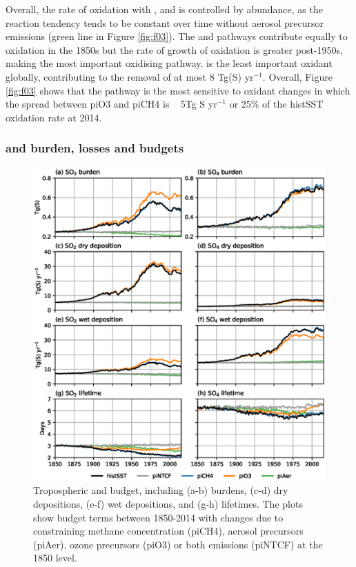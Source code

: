 Overall, the rate of  oxidation with ,  and  is controlled by  abundance, as the reaction tendency tends to be constant over time without aerosol precursor emissions (green line in Figure \ref{fig:f03}). The  and  pathways contribute equally to  oxidation in the 1850s but the rate of growth of  oxidation is greater post-1950s, making  the most important oxidising pathway.  is the least important oxidant globally, contributing to the removal of at most 8 Tg(S) yr$^{-1}$. Overall, Figure \ref{fig:f03} shows that the  pathway is the most sensitive to oxidant changes in which the spread between piO3 and piCH4 is ~ 5Tg S yr$^{-1}$ or 25\% of the histSST oxidation rate at 2014.



\subsubsection{ and  burden, losses and budgets}

\begin{figure}
    \centering
    \includegraphics[width=\linewidth]{Chapter3/Figs/f04_s-budget.eps}
    \caption{Tropospheric  and  budget, including (a-b) burdens, (c-d) dry depositions, (e-f) wet depositions, and (g-h) lifetimes. The plots show budget terms between 1850-2014 with changes due to constraining  methane concentration (piCH4), aerosol precursors (piAer), ozone precursors (piO3) or both emissions (piNTCF) at the 1850 level.}
    \label{fig:f04}
\end{figure}

